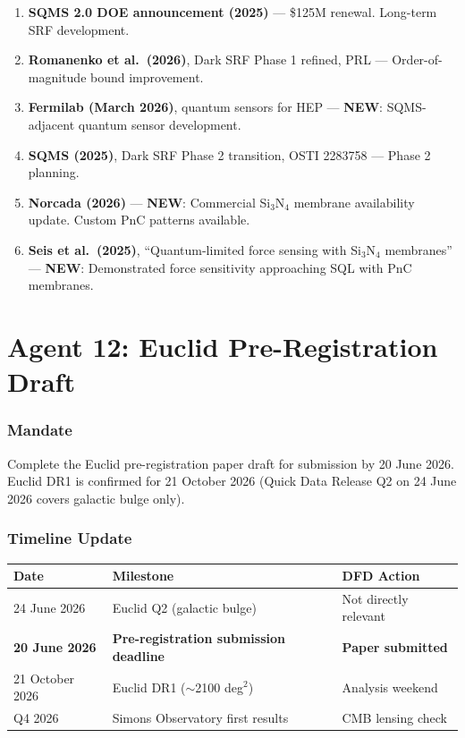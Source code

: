\documentclass[11pt,a4paper]{article}
\newcommand{\NEW}{\textcolor{dfdblue}{\textbf{NEW}}}
\begin{document}
\begin{enumerate}
\item \textbf{SQMS 2.0 DOE announcement (2025)} --- \$125M renewal. Long-term SRF development.

\item \textbf{Romanenko et al.\ (2026)}, Dark SRF Phase 1 refined, PRL --- Order-of-magnitude bound improvement.

\item \textbf{Fermilab (March 2026)}, quantum sensors for HEP --- \NEW: SQMS-adjacent quantum sensor development.

\item \textbf{SQMS (2025)}, Dark SRF Phase 2 transition, OSTI 2283758 --- Phase 2 planning.

\item \textbf{Norcada (2026)} --- \NEW: Commercial Si$_3$N$_4$ membrane availability update. Custom PnC patterns available.

\item \textbf{Seis et al.\ (2025)}, ``Quantum-limited force sensing with Si$_3$N$_4$ membranes'' --- \NEW: Demonstrated force sensitivity approaching SQL with PnC membranes.
\end{enumerate}


\part{Agent 12: Euclid Pre-Registration Draft}
\label{part:agent12}

\section{Mandate}

Complete the Euclid pre-registration paper draft for submission by 20 June 2026. Euclid DR1 is confirmed for 21 October 2026 (Quick Data Release Q2 on 24 June 2026 covers galactic bulge only).

\section{Timeline Update}

\begin{center}
\begin{tabular}{lll}
\toprule
\textbf{Date} & \textbf{Milestone} & \textbf{DFD Action} \\
\midrule
24 June 2026 & Euclid Q2 (galactic bulge) & Not directly relevant \\
\textbf{20 June 2026} & \textbf{Pre-registration submission deadline} & \textbf{Paper submitted} \\
21 October 2026 & Euclid DR1 ($\sim$2100 deg$^2$) & Analysis weekend \\
Q4 2026 & Simons Observatory first results & CMB lensing check \\
\bottomrule
\end{tabular}
\end{center}
\end{document}
